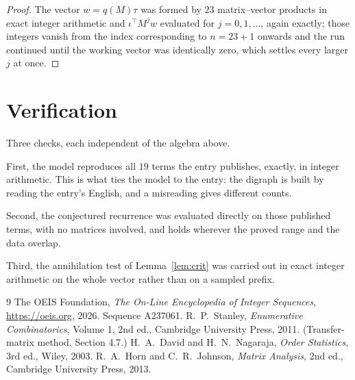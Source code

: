 \documentclass[11pt,a4paper]{article}
\theoremstyle{plain}
\theoremstyle{definition}
\begin{document}
\begin{proof}
The vector $w=q(M)\tau$ was formed by $23$ matrix--vector products in exact integer
arithmetic and $\iota^{\!\top}M^{j}w$ evaluated for $j=0,1,\dots$, again exactly; those
integers vanish from the index corresponding to $n=23+1$ onwards and the run continued
until the working vector was identically zero, which settles every larger $j$ at once.
\end{proof}

\section{Verification}

Three checks, each independent of the algebra above.

First, the model reproduces all $19$ terms the entry publishes, exactly, in integer
arithmetic. This is what ties the model to the entry: the digraph is built by reading the
entry's English, and a misreading gives different counts.

Second, the conjectured recurrence was evaluated directly on those published terms, with no
matrices involved, and holds wherever the proved range and the data overlap.

Third, the annihilation test of Lemma~\ref{lem:crit} was carried out in exact integer
arithmetic on the whole vector rather than on a sampled prefix.

\begin{thebibliography}{9}
 The OEIS Foundation, \emph{The On-Line Encyclopedia of Integer
Sequences}, \url{https://oeis.org}, 2026. Sequence A237061.
 R.~P.~Stanley, \emph{Enumerative Combinatorics}, Volume 1, 2nd ed.,
Cambridge University Press, 2011. (Transfer-matrix method, Section 4.7.)
 H.~A.~David and H.~N.~Nagaraja, \emph{Order Statistics}, 3rd ed., Wiley,
2003.
 R.~A.~Horn and C.~R.~Johnson, \emph{Matrix Analysis}, 2nd ed., Cambridge
University Press, 2013.
\end{thebibliography}
\end{document}
